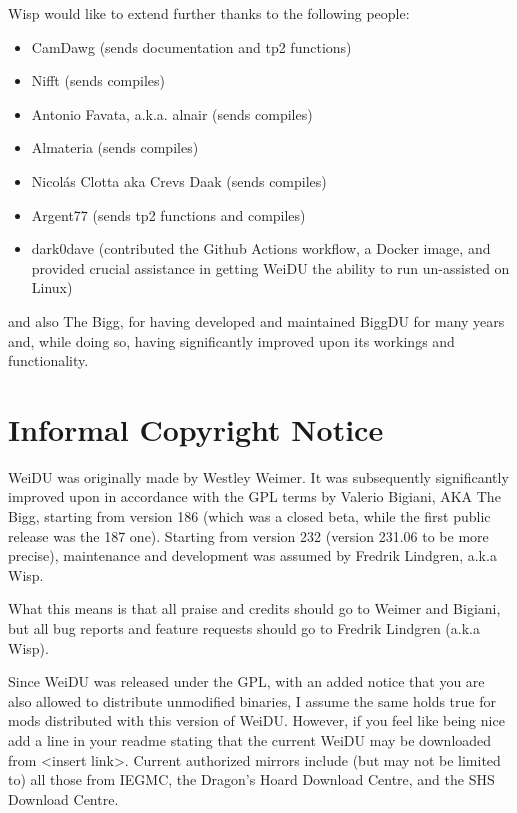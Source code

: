 \documentclass{article}
\begin{document}
Wisp would like to extend further thanks to the following people:
\begin{itemize}
\item CamDawg (sends documentation and tp2 functions)
\item Nifft (sends compiles)
\item Antonio Favata, a.k.a. alnair (sends compiles)
\item Almateria (sends compiles)
\item Nicolás Clotta aka Crevs Daak (sends compiles)
\item Argent77 (sends tp2 functions and compiles)
\item dark0dave (contributed the Github Actions workflow, a Docker
  image, and provided crucial assistance in getting WeiDU the ability
  to run un-assisted on Linux)
\end{itemize}
and also The Bigg, for having developed and maintained BiggDU for many years and, while doing so, having significantly improved upon its workings and functionality.

\section{Informal Copyright Notice}
WeiDU was originally made by Westley Weimer. It was subsequently significantly
improved upon in accordance with the GPL terms by Valerio Bigiani, AKA The Bigg,
starting from version 186 (which was a closed beta, while the first public
release was the 187 one). Starting from version 232 (version 231.06 to be more precise),
maintenance and development was assumed by Fredrik Lindgren, a.k.a Wisp.

What this means is that all praise and credits should go to Weimer and Bigiani,
but all bug reports and feature requests should go to Fredrik Lindgren (a.k.a Wisp).

Since WeiDU was released under the GPL, with an added notice that you are also
allowed to distribute unmodified binaries, I assume the same holds true for
mods distributed with this version of WeiDU. However, if you feel like being
nice add a line in your readme stating that the current WeiDU may be downloaded
from <insert link>. Current authorized mirrors include (but may not be limited to)
all those from IEGMC, the Dragon's Hoard Download Centre, and the SHS Download Centre.
\end{document}
